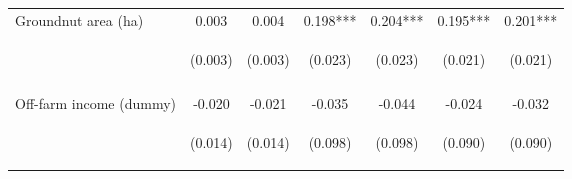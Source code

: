 \begin{center}
\begin{tabular}{lcccccc}
Groundnut area (ha) & 0.003 & 0.004 & 0.198*** & 0.204*** & 0.195*** & 0.201*** \\
 & \begin{footnotesize}(0.003)\end{footnotesize} & \begin{footnotesize}(0.003)\end{footnotesize} & \begin{footnotesize}(0.023)\end{footnotesize} & \begin{footnotesize}(0.023)\end{footnotesize} & \begin{footnotesize}(0.021)\end{footnotesize} & \begin{footnotesize}(0.021)\end{footnotesize} \\
\vspace{4pt} & \begin{footnotesize}[0.410]\end{footnotesize} & \begin{footnotesize}[0.282]\end{footnotesize} & \begin{footnotesize}[0.000]\end{footnotesize} & \begin{footnotesize}[0.000]\end{footnotesize} & \begin{footnotesize}[0.000]\end{footnotesize} & \begin{footnotesize}[0.000]\end{footnotesize} \\
Off-farm income (dummy) & -0.020 & -0.021 & -0.035 & -0.044 & -0.024 & -0.032 \\
 & \begin{footnotesize}(0.014)\end{footnotesize} & \begin{footnotesize}(0.014)\end{footnotesize} & \begin{footnotesize}(0.098)\end{footnotesize} & \begin{footnotesize}(0.098)\end{footnotesize} & \begin{footnotesize}(0.090)\end{footnotesize} & \begin{footnotesize}(0.090)\end{footnotesize} \\

\end{tabular}
\end{center}
